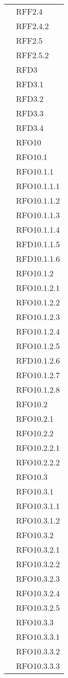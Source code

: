 \begin{longtable}{ p{12cm} | p{4cm} }
		    & RFF2.4 \\
		    & RFF2.4.2 \\
		    & RFF2.5 \\
		    & RFF2.5.2 \\
		    & RFD3 \\
		    & RFD3.1 \\
		    & RFD3.2 \\
		    & RFD3.3 \\
		    & RFD3.4 \\
		    & RFO10 \\
& RFO10.1 \\
& RFO10.1.1 \\
& RFO10.1.1.1 \\
& RFO10.1.1.2 \\
& RFO10.1.1.3 \\
& RFO10.1.1.4 \\
& RFD10.1.1.5 \\
& RFD10.1.1.6 \\
& RFO10.1.2 \\
& RFO10.1.2.1 \\
& RFO10.1.2.2 \\
& RFO10.1.2.3 \\
& RFO10.1.2.4 \\
& RFO10.1.2.5 \\
& RFD10.1.2.6 \\
& RFO10.1.2.7 \\
& RFO10.1.2.8 \\
& RFO10.2 \\
& RFO10.2.1 \\
& RFO10.2.2 \\
& RFO10.2.2.1 \\
& RFO10.2.2.2 \\
& RFO10.3 \\
& RFO10.3.1 \\
& RFO10.3.1.1 \\
& RFO10.3.1.2 \\
& RFO10.3.2 \\
& RFO10.3.2.1 \\
& RFO10.3.2.2 \\
& RFO10.3.2.3 \\
& RFO10.3.2.4 \\
& RFO10.3.2.5 \\
& RFO10.3.3 \\
& RFO10.3.3.1 \\
& RFO10.3.3.2 \\
& RFO10.3.3.3 \\

\end{longtable}
